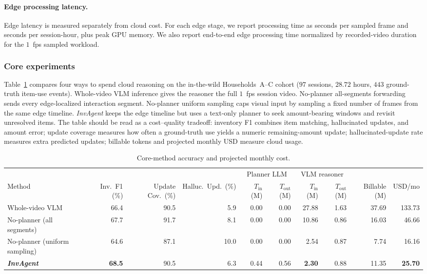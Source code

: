 \documentclass[sigconf,anonymous,nonacm]{acmart}
\newcommand{\sys}{\textit{InvAgent}\xspace}
\begin{document}
\paragraph{Edge processing latency.}
Edge latency is measured separately from cloud cost. For each edge
stage, we report processing time as seconds per sampled frame and
seconds per session-hour, plus peak GPU memory. We also report
end-to-end edge processing time normalized by recorded-video duration
for the $1$~fps sampled workload.

\subsubsection{Core experiments}

Table~\ref{tab:primary} compares four ways to spend cloud reasoning on
the in-the-wild Households~A--C cohort ($97$ sessions, $28.72$ hours,
$443$ ground-truth item-use events). Whole-video VLM inference gives the
reasoner the full $1$~fps session video. No-planner all-segments
forwarding sends every edge-localized interaction segment. No-planner
uniform sampling caps visual input by sampling a fixed number of frames
from the same edge timeline. \sys keeps the edge timeline but uses a
text-only planner to seek amount-bearing windows and revisit unresolved
items. The table should be read as a cost--quality tradeoff:
inventory F1 combines item matching, hallucinated updates, and amount
error; update coverage measures how often a ground-truth use yields a
numeric remaining-amount update; hallucinated-update rate measures extra
predicted updates; billable tokens and projected monthly USD measure
cloud usage.


\begin{table}[t]
\centering
\small
\setlength{\tabcolsep}{4pt}
\caption{Core-method accuracy and projected monthly cost.}
\label{tab:primary}
\begin{tabular}{lrrrrrrrrr}
\toprule
& & & & \multicolumn{2}{c}{Planner LLM} & \multicolumn{2}{c}{VLM reasoner} & & \\
\cmidrule(lr){5-6}\cmidrule(lr){7-8}
Method & Inv.~F1 (\%) & Update Cov.~(\%) & Halluc.~Upd.~(\%) & $T_{\mathrm{in}}$ (M) & $T_{\mathrm{out}}$ (M) & $T_{\mathrm{in}}$ (M) & $T_{\mathrm{out}}$ (M) & Billable (M) & USD/mo \\
\midrule
Whole-video VLM                 & 66.4 & 90.5 & 5.9 & 0.00 & 0.00 & 27.88 & 1.63 & 37.69 & 133.73 \\
No-planner (all segments)       & 67.7 & 91.7 & 8.1 & 0.00 & 0.00 & 10.86 & 0.86 & 16.03 &  46.66 \\
No-planner (uniform sampling)   & 64.6 & 87.1 & 10.0 & 0.00 & 0.00 &  2.54 & 0.87 &  7.74 &  16.16 \\
\textbf{\sys}                 & \textbf{68.5} & 90.5 & 6.3 & 0.44 & 0.56 & \textbf{2.30} & 0.88 & 11.35 & \textbf{25.70} \\
\bottomrule
\end{tabular}
\end{table}
\end{document}
